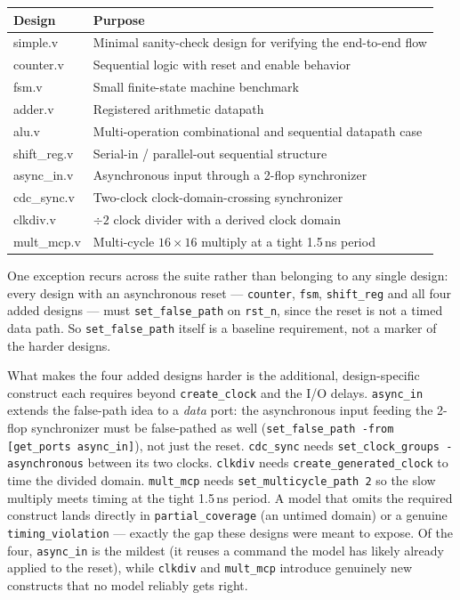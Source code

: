 \documentclass[11pt]{article}
\begin{document}
\begin{table}[h]
\centering
\begin{tabularx}{\textwidth}{>{\ttfamily\raggedright\arraybackslash}p{} X}
\toprule
\textbf{Design} & \textbf{Purpose} \\
\midrule
simple.v & Minimal sanity-check design for verifying the end-to-end flow \\
counter.v & Sequential logic with reset and enable behavior \\
fsm.v & Small finite-state machine benchmark \\
adder.v & Registered arithmetic datapath \\
alu.v & Multi-operation combinational and sequential datapath case \\
shift\_reg.v & Serial-in / parallel-out sequential structure \\
\midrule
async\_in.v & Asynchronous input through a 2-flop synchronizer \\
cdc\_sync.v & Two-clock clock-domain-crossing synchronizer \\
clkdiv.v & $\div2$ clock divider with a derived clock domain \\
mult\_mcp.v & Multi-cycle $16\times16$ multiply at a tight 1.5\,ns period \\
\bottomrule
\end{tabularx}
\end{table}

One exception recurs across the suite rather than belonging to any single design: every design with an asynchronous reset --- \texttt{counter}, \texttt{fsm}, \texttt{shift\_reg} and all four added designs --- must \texttt{set\_false\_path} on \texttt{rst\_n}, since the reset is not a timed data path. So \texttt{set\_false\_path} itself is a baseline requirement, not a marker of the harder designs.

What makes the four added designs harder is the additional, design-specific construct each requires beyond \texttt{create\_clock} and the I/O delays. \texttt{async\_in} extends the false-path idea to a \emph{data} port: the asynchronous input feeding the 2-flop synchronizer must be false-pathed as well (\texttt{set\_false\_path -from [get\_ports async\_in]}), not just the reset. \texttt{cdc\_sync} needs \texttt{set\_clock\_groups -asynchronous} between its two clocks. \texttt{clkdiv} needs \texttt{create\_generated\_clock} to time the divided domain. \texttt{mult\_mcp} needs \texttt{set\_multicycle\_path 2} so the slow multiply meets timing at the tight 1.5\,ns period. A model that omits the required construct lands directly in \texttt{partial\_coverage} (an untimed domain) or a genuine \texttt{timing\_violation} --- exactly the gap these designs were meant to expose. Of the four, \texttt{async\_in} is the mildest (it reuses a command the model has likely already applied to the reset), while \texttt{clkdiv} and \texttt{mult\_mcp} introduce genuinely new constructs that no model reliably gets right.
\end{document}
